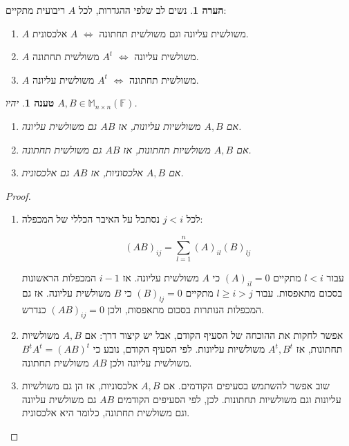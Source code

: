 \documentclass[12pt]{report}
\theoremstyle{plain}
\newtheorem{proposition}[theorem]{טענה}
\theoremstyle{definition}
\newtheorem{remark}{הערה}[chapter]
\newcommand{\F}{\mathbb{F}}
\newcommand{\M}{\mathbb{M}}
\newcommand{\0}{\mathbf{0}}
\begin{document}
\begin{remark}
נשים לב שלפי ההגדרות, לכל 
$A$
ריבועית מתקיים:
\begin{enumerate}[label=\alph*.]
\item 
$A$
משולשית עליונה וגם משולשית תחתונה 
$\iff$
$A$
אלכסונית.


\item 
$A$
משולשית עליונה
$\iff$
$A^t$
משולשית תחתונה.


\item
$A$
משולשית תחתונה
$\iff$
$A^t$
משולשית עליונה.


\end{enumerate}
\end{remark}

\begin{proposition}
יהיו
$A,B\in\M_{n\times n}(\F)$.
\begin{enumerate}[label=\alph*.]
\item
אם
$A,B$
משולשיות עליונות, אז
$AB$
גם משולשית עליונה.


\item
אם
$A,B$
משולשיות תחתונות, אז
$AB$
גם משולשית תחתונה.


\item
אם
$A,B$
אלכסוניות, אז
$AB$
גם אלכסונית.


\end{enumerate}
\end{proposition}

\begin{proof}\
\begin{enumerate}[label=\alph*.]
\item 
לכל 
$j<i$
נסתכל על האיבר הכללי של המכפלה:

$$
(AB)_{ij}=\sum_{l=1}^n (A)_{il}(B)_{lj}
$$

עבור 
$l< i$
מתקיים
$(A)_{il}=0$
כי 
$A$
משולשית עליונה. אז 
$i-1$
המכפלות הראשונות בסכום מתאפסות.
עבור 
$l\geq i>j$
מתקיים
$(B)_{lj}=0$
כי 
$B$
משולשית עליונה. אז גם המכפלות הנותרות בסכום מתאפסות, ולכן
$(AB)_{ij}=0$
כנדרש.


\item 
אפשר לחקות את ההוכחה של הסעיף הקודם, אבל יש קיצור דרך: אם 
$A,B$
משולשיות תחתונות, אז
$A^t,B^t$
משולשיות עליונות. לפי הסעיף הקודם, נובע כי
$B^tA^t=(AB)^t$
משולשית עליונה ולכן
$AB$
משולשית תחתונה.


\item 
שוב אפשר להשתמש בסעיפים הקודמים. אם 
$A,B$
אלכסוניות, אז הן גם משולשיות עליונות וגם משולשיות תחתונות. לכן, לפי הסעיפים הקודמים
$AB$
גם משולשית עליונה וגם משולשית תחתונה, כלומר היא אלכסונית.


\end{enumerate}
\end{proof}
\end{document}
